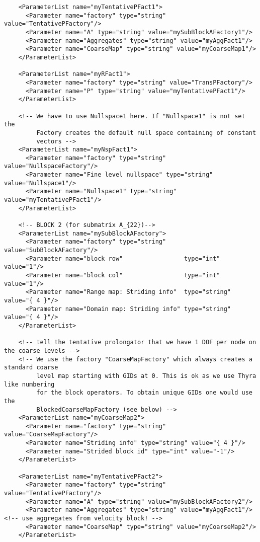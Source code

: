 \documentclass[10pt,fleqn]{book}
\begin{document}
\begin{lstlisting}
    <ParameterList name="myTentativePFact1">
      <Parameter name="factory" type="string" value="TentativePFactory"/>
      <Parameter name="A" type="string" value="mySubBlockAFactory1"/>
      <Parameter name="Aggregates" type="string" value="myAggFact1"/>
      <Parameter name="CoarseMap" type="string" value="myCoarseMap1"/>
    </ParameterList>

    <ParameterList name="myRFact1">
      <Parameter name="factory" type="string" value="TransPFactory"/>
      <Parameter name="P" type="string" value="myTentativePFact1"/>
    </ParameterList>

    <!-- We have to use Nullspace1 here. If "Nullspace1" is not set the
         Factory creates the default null space containing of constant
         vectors -->
    <ParameterList name="myNspFact1">
      <Parameter name="factory" type="string" value="NullspaceFactory"/>
      <Parameter name="Fine level nullspace" type="string" value="Nullspace1"/>
      <Parameter name="Nullspace1" type="string" value="myTentativePFact1"/>
    </ParameterList>

    <!-- BLOCK 2 (for submatrix A_{22})-->
    <ParameterList name="mySubBlockAFactory">
      <Parameter name="factory" type="string" value="SubBlockAFactory"/>
      <Parameter name="block row"                 type="int"     value="1"/>
      <Parameter name="block col"                 type="int"     value="1"/>
      <Parameter name="Range map: Striding info"  type="string"  value="{ 4 }"/>
      <Parameter name="Domain map: Striding info" type="string"  value="{ 4 }"/>
    </ParameterList>

    <!-- tell the tentative prolongator that we have 1 DOF per node on the coarse levels -->
    <!-- We use the factory "CoarseMapFactory" which always creates a standard coarse
         level map starting with GIDs at 0. This is ok as we use Thyra like numbering
         for the block operators. To obtain unique GIDs one would use the
         BlockedCoarseMapFactory (see below) -->
    <ParameterList name="myCoarseMap2">
      <Parameter name="factory" type="string" value="CoarseMapFactory"/>
      <Parameter name="Striding info" type="string" value="{ 4 }"/>
      <Parameter name="Strided block id" type="int" value="-1"/>
    </ParameterList>

    <ParameterList name="myTentativePFact2">
      <Parameter name="factory" type="string" value="TentativePFactory"/>
      <Parameter name="A" type="string" value="mySubBlockAFactory2"/>
      <Parameter name="Aggregates" type="string" value="myAggFact1"/> <!-- use aggregates from velocity block! -->
      <Parameter name="CoarseMap" type="string" value="myCoarseMap2"/>
    </ParameterList>


\end{lstlisting}
\end{document}
